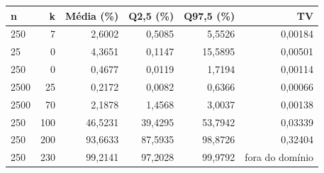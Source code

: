 \begin{tabular}{lrrrrr}
\toprule
n & k & Média (\%) & Q2,5 (\%) & Q97,5 (\%) & TV \\
\midrule
250 & 7 & 2,6002 & 0,5085 & 5,5526 & 0,00184 \\
25 & 0 & 4,3651 & 0,1147 & 15,5895 & 0,00501 \\
250 & 0 & 0,4677 & 0,0119 & 1,7194 & 0,00114 \\
2500 & 25 & 0,2172 & 0,0082 & 0,6366 & 0,00066 \\
2500 & 70 & 2,1878 & 1,4568 & 3,0037 & 0,00138 \\
250 & 100 & 46,5231 & 39,4295 & 53,7942 & 0,03339 \\
250 & 200 & 93,6633 & 87,5935 & 98,8726 & 0,32404 \\
250 & 230 & 99,2141 & 97,2028 & 99,9792 & fora do domínio \\
\bottomrule
\end{tabular}
